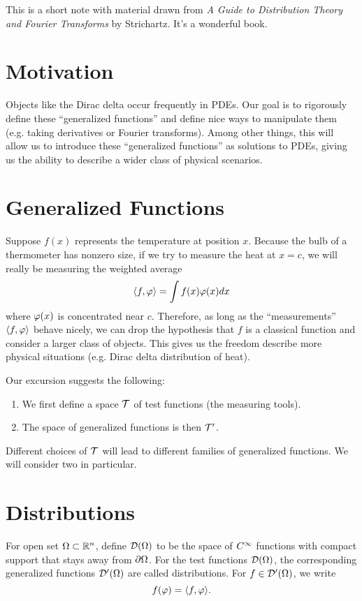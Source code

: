 This is a short note with material drawn from \textit{A Guide to Distribution Theory and Fourier Transforms} by Strichartz. It's a wonderful book.

\sepline

\section{Motivation}
Objects like the Dirac delta occur frequently in PDEs. Our goal is to rigorously define these ``generalized functions'' and define nice ways to manipulate them (e.g. taking derivatives or Fourier transforms). Among other things, this will allow us to introduce these ``generalized functions'' as solutions to PDEs, giving us the ability to describe a wider class of physical scenarios.

\section{Generalized Functions}
Suppose $f(x)$ represents the temperature at position $x$. Because the bulb of a thermometer has nonzero size, if we try to measure the heat at $x = c$, we will really be measuring the weighted average
\[
    \langle f, \varphi \rangle = \int f(x)\varphi(x)dx
\]
where $\varphi(x)$ is concentrated near $c$. Therefore, as long as the ``measurements'' $\langle f, \varphi \rangle$ behave nicely, we can drop the hypothesis that $f$ is a classical function and consider a larger class of objects. This gives us the freedom describe more physical situations (e.g. Dirac delta distribution of heat).

Our excursion suggests the following:
\begin{enumerate}
    \item We first define a space ${\mathcal T}$ of test functions (the measuring tools).
    \item The space of generalized functions is then ${\mathcal T}'$.
\end{enumerate}

Different choices of ${\mathcal T}$ will lead to different families of generalized functions. We will consider two in particular.

\section{Distributions}
For open set $\Omega \subset {\mathbb R}^n$, define ${\mathcal D}(\Omega)$ to be the space of $C^\infty$ functions with compact support that stays away from $\partial \Omega$. For the test functions ${\mathcal D}(\Omega)$, the corresponding generalized functions ${\mathcal D}'(\Omega)$ are called distributions. For $f \in {\mathcal D}'(\Omega)$, we write
\[
    f(\varphi) = \langle f, \varphi \rangle.
\]


